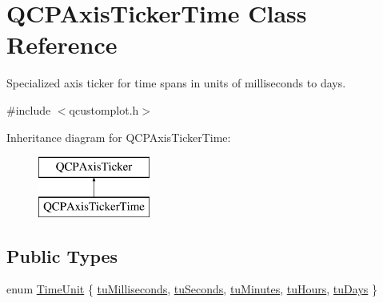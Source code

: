 \hypertarget{class_q_c_p_axis_ticker_time}{}\section{Q\+C\+P\+Axis\+Ticker\+Time Class Reference}
\label{class_q_c_p_axis_ticker_time}


Specialized axis ticker for time spans in units of milliseconds to days.  




{\ttfamily \#include $<$qcustomplot.\+h$>$}

Inheritance diagram for Q\+C\+P\+Axis\+Ticker\+Time\+:\begin{figure}[H]
\begin{center}
\leavevmode
\includegraphics[height=2.000000cm]{db/d4d/class_q_c_p_axis_ticker_time}
\end{center}
\end{figure}
\subsection*{Public Types}
\begin{DoxyCompactItemize}
\item 
enum \mbox{\hyperlink{class_q_c_p_axis_ticker_time_a5c48ded8c6d3a1aca9b68219469fea3e}{Time\+Unit}} \{ \newline
\mbox{\hyperlink{class_q_c_p_axis_ticker_time_a5c48ded8c6d3a1aca9b68219469fea3ea809db637d2a7f601287c8790facc25cf}{tu\+Milliseconds}}, 
\mbox{\hyperlink{class_q_c_p_axis_ticker_time_a5c48ded8c6d3a1aca9b68219469fea3ea22b2c1842215272ae827eea2d1cc037d}{tu\+Seconds}}, 
\mbox{\hyperlink{class_q_c_p_axis_ticker_time_a5c48ded8c6d3a1aca9b68219469fea3ea682de6640daef46cffd8a080348d7d00}{tu\+Minutes}}, 
\mbox{\hyperlink{class_q_c_p_axis_ticker_time_a5c48ded8c6d3a1aca9b68219469fea3ea83a5713594424ba17f1f62f18f0e5935}{tu\+Hours}}, 
\newline
\mbox{\hyperlink{class_q_c_p_axis_ticker_time_a5c48ded8c6d3a1aca9b68219469fea3eaf9729e64545307a80a0e3527d6da6556}{tu\+Days}}
 \}
\end{DoxyCompactItemize}
